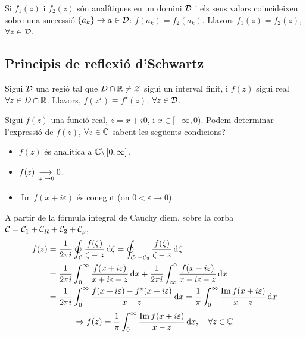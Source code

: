 \begin{thm}[d'unicitat]
    Si $f_{1}(z)$ i $f_{2}(z)$ són analítiques en un domini $\mathcal{D}$ i els seus valors coincideixen sobre una successió $\left\{ a_{k} \right\} \to a \in \mathcal{D}$: $f(a_{k}) = f_{2}(a_{k})$. Llavors $f_{1}(z) = f_{2}(z)$, $\forall z \in \mathcal{D}$.
\end{thm}

\subsection{Principis de reflexió d'Schwartz}
\begin{thm}
    Sigui $\mathcal{D}$ una regió tal que $D \cap \mathbb{R} \neq \varnothing$ sigui un interval finit, i $f(z)$ sigui real $\forall z \in D \cap \mathbb{R}$. Llavors, $f(z^{\star}) \equiv f^{\star}(z)$, $\forall z \in \mathcal{D}$.
\end{thm}
\begin{example}
    Sigui $f(z)$ una funció real, $z = x + i0$, i $x \in [-\infty, 0)$. Podem determinar l'expressió de $f(z)$, $\forall z \in \mathbb{C}$ sabent les següents condicions?
    \begin{itemize}
        \item $f(z)$ és analítica a $\mathbb{C} \backslash \left[ 0,\infty \right]$.
        \item $f(z) \underset{\left| z \right| \to 0}{\longrightarrow} 0$.
        \item $\operatorname{Im} f(x + i\varepsilon)$ és conegut (on $0 < \varepsilon \to 0$).
    \end{itemize}
    A partir de la fórmula integral de Cauchy diem, sobre la corba $\mathcal{C} = \mathcal{C}_{1} + \mathcal{C}_{R} + \mathcal{C}_{2} + \mathcal{C}_{\rho}$,
    \begin{align*}
    \begin{aligned}
        f(z) &= \frac{1}{2\pi i} \oint_{\mathcal{C}} \frac{f(\zeta)}{\zeta - z} \mathop{}\!\mathrm{d} \zeta =  \oint_{\mathcal{C}_{1}+\mathcal{C}_{2}} \frac{f(\zeta)}{\zeta - z} \mathop{}\!\mathrm{d} \zeta \\
        &= \frac{1}{2\pi i} \int_{0}^{\infty} \frac{f(x + i \varepsilon)}{x + i \varepsilon - z} \mathop{}\!\mathrm{d} x + \frac{1}{2\pi i} \int_{\infty}^{0} \frac{f(x - i \varepsilon)}{x - i \varepsilon - z} \mathop{}\!\mathrm{d} x \\
        &= \frac{1}{2\pi i} \int_{0}^{\infty} \frac{f(x + i \varepsilon) - f^{\star}(x + i \varepsilon)}{x-z} \mathop{}\!\mathrm{d} x = \frac{1}{\pi} \int_{0}^{\infty} \frac{\operatorname{Im}f(x + i \varepsilon)}{x - z} \mathop{}\!\mathrm{d} x
    \end{aligned}
    \end{align*}
    \begin{align*}
        \Rightarrow f(z) = \frac{1}{\pi} \int_{0}^{\infty} \frac{\operatorname{Im}f(x + i \varepsilon)}{x - z} \mathop{}\!\mathrm{d} x, \quad \forall z \in \mathbb{C}
    \end{align*}
\end{example}

